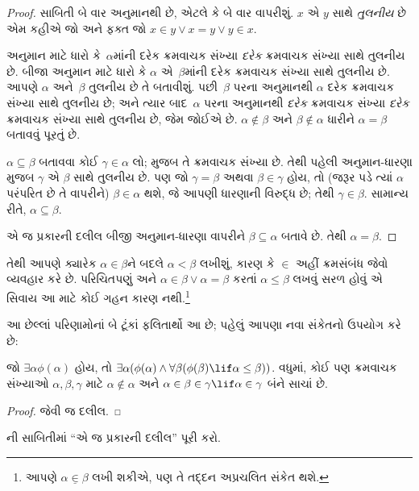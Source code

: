 \begin{proof}
સાબિતી બે વાર અનુમાનથી છે, એટલે કે
 બે વાર વાપરીશું.
$x$ એ $y$ સાથે \emph{તુલનીય} છે એમ કહીએ
જો અને ફક્ત જો
$x \in y \lor x = y \lor y \in x$.

અનુમાન માટે ધારો કે~$\alpha$માંની દરેક
ક્રમવાચક સંખ્યા \emph{દરેક} ક્રમવાચક
સંખ્યા સાથે તુલનીય છે.
બીજા અનુમાન માટે ધારો કે
$\alpha$ એ~$\beta$માંની દરેક ક્રમવાચક
સંખ્યા સાથે તુલનીય છે.
આપણે $\alpha$ અને~$\beta$ તુલનીય છે તે
બતાવીશું. પછી~$\beta$ પરના અનુમાનથી
$\alpha$ દરેક ક્રમવાચક સંખ્યા સાથે
તુલનીય છે; અને ત્યાર બાદ~$\alpha$ પરના
અનુમાનથી \emph{દરેક} ક્રમવાચક સંખ્યા
\emph{દરેક} ક્રમવાચક સંખ્યા સાથે તુલનીય
છે, જેમ જોઈએ છે.
$\alpha \notin \beta$ અને
$\beta \notin
\alpha$ ધારીને $\alpha = \beta$ બતાવવું પૂરતું છે.

$\alpha \subseteq \beta$ બતાવવા કોઈ
$\gamma \in \alpha$ લો; 
મુજબ તે ક્રમવાચક સંખ્યા છે.
તેથી પહેલી અનુમાન-ધારણા મુજબ
$\gamma$ એ $\beta$ સાથે તુલનીય છે.
પણ જો $\gamma
= \beta$ અથવા $\beta \in \gamma$ હોય,
તો (જરૂર પડે ત્યાં $\alpha$ પરંપરિત છે તે
વાપરીને) $\beta \in \alpha$ થશે, જે
આપણી ધારણાની વિરુદ્ધ છે; તેથી
$\gamma \in \beta$. સામાન્ય રીતે,
$\alpha \subseteq
\beta$.

એ જ પ્રકારની દલીલ બીજી અનુમાન-ધારણા
વાપરીને $\beta \subseteq \alpha$ બતાવે છે.
તેથી $\alpha = \beta$.
\end{proof}\noindent તેથી આપણે ક્યારેક
$\alpha \in \beta$ને બદલે $\alpha <\beta$
લખીશું, કારણ કે $\in$ અહીં ક્રમસંબંધ
જેવો વ્યવહાર કરે છે. પરિચિતપણું અને
$\alpha \in
\beta \lor \alpha = \beta$ કરતાં
$\alpha \leq \beta$ લખવું સરળ હોવું
એ સિવાય આ માટે કોઈ ગહન કારણ નથી.\footnote{
આપણે $\alpha
\mathrel{\underline{\in}} \beta$ લખી શકીએ,
પણ તે તદ્દન અપ્રચલિત સંકેત થશે.}

આ છેલ્લાં પરિણામોનાં બે ટૂંકાં ફલિતાર્થો
આ છે; પહેલું આપણા નવા સંકેતનો ઉપયોગ કરે છે:

\begin{cor}
જો $\exists \alpha\phi(\alpha)$ હોય, તો
$\exists \alpha(\phi(\alpha)
\land \forall \beta(\phi(\beta) \lif \alpha \leq \beta))$.
વધુમાં, કોઈ પણ ક્રમવાચક સંખ્યાઓ
$\alpha, \beta, \gamma$ માટે
$\alpha
\notin \alpha$ અને
$\alpha \in \beta \in \gamma \lif \alpha \in
\gamma$ બંને સાચાં છે.
\end{cor}

\begin{proof}
 જેવી જ દલીલ.
\end{proof}

\begin{prob}
ની
સાબિતીમાં “એ જ પ્રકારની દલીલ” પૂરી કરો.
\end{prob}

